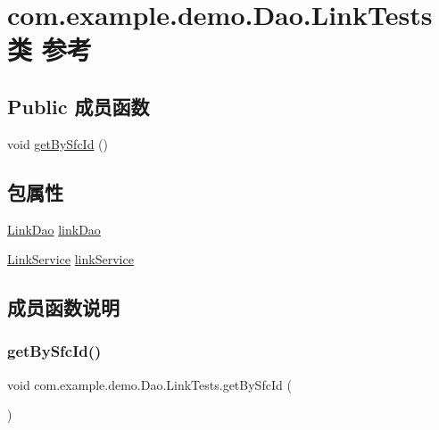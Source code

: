 \hypertarget{classcom_1_1example_1_1demo_1_1_dao_1_1_link_tests}{}\section{com.\+example.\+demo.\+Dao.\+Link\+Tests类 参考}
\label{classcom_1_1example_1_1demo_1_1_dao_1_1_link_tests}
\subsection*{Public 成员函数}
\begin{DoxyCompactItemize}
\item 
void \mbox{\hyperlink{classcom_1_1example_1_1demo_1_1_dao_1_1_link_tests_ae49067db2cc7cc84108464daade91d6f}{get\+By\+Sfc\+Id}} ()
\end{DoxyCompactItemize}
\subsection*{包属性}
\begin{DoxyCompactItemize}
\item 
\mbox{\hyperlink{interfacecom_1_1example_1_1demo_1_1dao_1_1_link_dao}{Link\+Dao}} \mbox{\hyperlink{classcom_1_1example_1_1demo_1_1_dao_1_1_link_tests_a0ccab41b1a93a241bd734a3123c6354e}{link\+Dao}}
\item 
\mbox{\hyperlink{classcom_1_1example_1_1demo_1_1service_1_1_link_service}{Link\+Service}} \mbox{\hyperlink{classcom_1_1example_1_1demo_1_1_dao_1_1_link_tests_a8fdec6a9ff0fa37ce8d8c7b5abc776fd}{link\+Service}}
\end{DoxyCompactItemize}


\subsection{成员函数说明}
\mbox{\label{classcom_1_1example_1_1demo_1_1_dao_1_1_link_tests_ae49067db2cc7cc84108464daade91d6f}} 
\subsubsection{\texorpdfstring{get\+By\+Sfc\+Id()}{getBySfcId()}}
{\footnotesize\ttfamily void com.\+example.\+demo.\+Dao.\+Link\+Tests.\+get\+By\+Sfc\+Id (\begin{DoxyParamCaption}{ }\end{DoxyParamCaption})}



